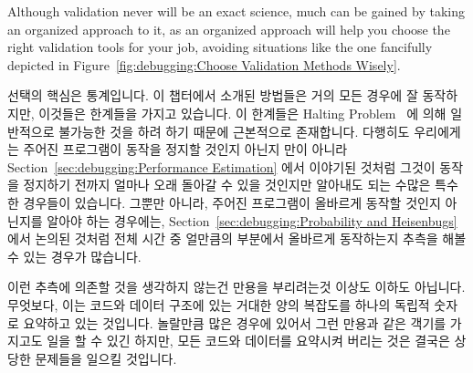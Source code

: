 Although validation never will be an exact science, much can be gained
by taking an organized approach to it, as an organized approach will
help you choose the right validation tools for your job, avoiding
situations like the one fancifully depicted in
Figure~\ref{fig:debugging:Choose Validation Methods Wisely}.
\fi

선택의 핵심은 통계입니다.
이 챕터에서 소개된 방법들은 거의 모든 경우에 잘 동작하지만, 이것들은 한계들을
가지고 있습니다.
이 한계들은
Halting Problem~\cite{AlanMTuring1937HaltingProblem,GeoffreyKPullum2000HaltingProblem}
에 의해 일반적으로 불가능한 것을 하려 하기 때문에 근본적으로 존재합니다.
다행히도 우리에게는 주어진 프로그램이 동작을 정지할 것인지 아닌지 만이 아니라
Section~\ref{sec:debugging:Performance Estimation} 에서 이야기된 것처럼
그것이 동작을 정지하기 전까지 얼마나 오래 돌아갈 수 있을 것인지만 알아내도 되는
수많은 특수한 경우들이 있습니다.
그뿐만 아니라, 주어진 프로그램이 올바르게 동작할 것인지 아닌지를 알아야 하는
경우에는,
Section~\ref{sec:debugging:Probability and Heisenbugs} 에서 논의된 것처럼 전체
시간 중 얼만큼의 부분에서 올바르게 동작하는지 추측을 해볼 수 있는 경우가
많습니다.

이런 추측에 의존할 것을 생각하지 않는건 만용을 부리려는것 이상도 이하도
아닙니다.
무엇보다, 이는 코드와 데이터 구조에 있는 거대한 양의 복잡도를 하나의 독립적
숫자로 요약하고 있는 것입니다.
놀랄만큼 많은 경우에 있어서 그런 만용과 같은 객기를 가지고도 일을 할 수 있긴
하지만, 모든 코드와 데이터를 요약시켜 버리는 것은 결국은 상당한 문제들을 일으킬
것입니다.

